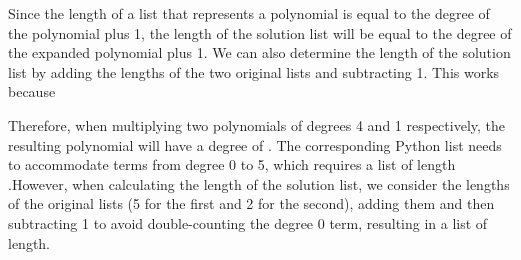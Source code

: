 \documentclass{article}
\begin{document}
Since the length of a list that represents a polynomial is equal to the degree of the polynomial plus 1, the length of the solution list will be equal to the degree of the expanded polynomial plus 1. We can also determine the length of the solution list by adding the lengths of the two original lists and subtracting 1. This works because 

Therefore, when multiplying two polynomials of degrees 4 and 1 respectively, the resulting polynomial will have a degree of . The corresponding Python list needs to accommodate terms from degree 0 to 5, which requires a list of length .However, when calculating the length of the solution list, we consider the lengths of the original lists (5 for the first and 2 for the second), adding them and then subtracting 1 to avoid double-counting the degree 0 term, resulting in a list of length.
\end{document}
